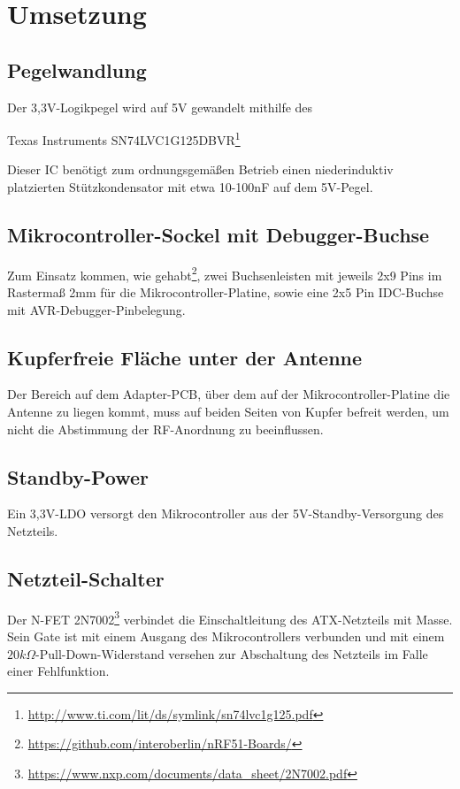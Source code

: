 
\section{Umsetzung}
\subsection{Pegelwandlung}
Der 3,3V-Logikpegel wird auf 5V gewandelt
mithilfe des
\begin{center}
	Texas Instruments SN74LVC1G125DBVR\footnote{\url{http://www.ti.com/lit/ds/symlink/sn74lvc1g125.pdf}}
\end{center}
Dieser IC ben\"otigt
zum ordnungsgem\"a{\ss}en Betrieb
einen niederinduktiv platzierten St\"utzkondensator
mit etwa 10-100nF
auf dem 5V-Pegel.

\subsection{Mikrocontroller-Sockel mit Debugger-Buchse}
Zum Einsatz kommen,
wie gehabt\footnote{\url{https://github.com/interoberlin/nRF51-Boards/}},
zwei Buchsenleisten mit jeweils 2x9 Pins im Rasterma{\ss} 2mm
f\"ur die Mikrocontroller-Platine,
sowie eine 2x5 Pin IDC-Buchse
mit AVR-Debugger-Pinbelegung.

\subsection{Kupferfreie Fl\"ache unter der Antenne}
Der Bereich auf dem Adapter-PCB,
\"uber dem auf der Mikrocontroller-Platine die Antenne zu liegen kommt,
muss auf beiden Seiten von Kupfer befreit werden,
um nicht die Abstimmung der RF-Anordnung zu beeinflussen.

\subsection{Standby-Power}
Ein 3,3V-LDO versorgt den Mikrocontroller
aus der 5V-Standby-Versorgung des Netzteils.

\subsection{Netzteil-Schalter}
Der N-FET 2N7002\footnote{\url{https://www.nxp.com/documents/data_sheet/2N7002.pdf}}
verbindet die Einschaltleitung des ATX-Netzteils
mit Masse.
Sein Gate
ist mit einem Ausgang
des Mikrocontrollers
verbunden
und mit einem $20k\Omega$-Pull-Down-Widerstand versehen
zur Abschaltung des Netzteils
im Falle einer Fehlfunktion.

